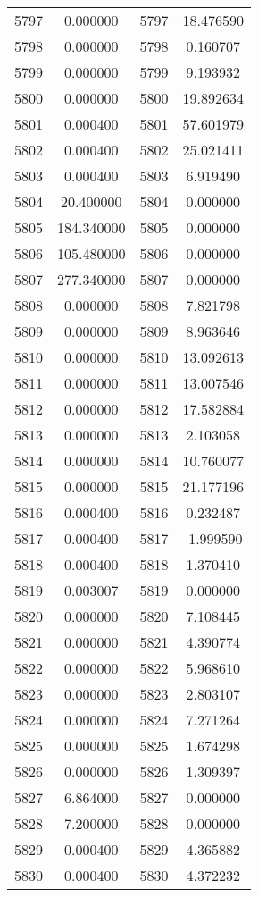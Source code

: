 \documentclass[12pt]{article}
\begin{document}
\begin{longtable}{@{}cccc@{}}
5797 & 0.000000 & 5797 & 18.476590 \\
5798 & 0.000000 & 5798 & 0.160707 \\
5799 & 0.000000 & 5799 & 9.193932 \\
5800 & 0.000000 & 5800 & 19.892634 \\
5801 & 0.000400 & 5801 & 57.601979 \\
5802 & 0.000400 & 5802 & 25.021411 \\
5803 & 0.000400 & 5803 & 6.919490 \\
5804 & 20.400000 & 5804 & 0.000000 \\
5805 & 184.340000 & 5805 & 0.000000 \\
5806 & 105.480000 & 5806 & 0.000000 \\
5807 & 277.340000 & 5807 & 0.000000 \\
5808 & 0.000000 & 5808 & 7.821798 \\
5809 & 0.000000 & 5809 & 8.963646 \\
5810 & 0.000000 & 5810 & 13.092613 \\
5811 & 0.000000 & 5811 & 13.007546 \\
5812 & 0.000000 & 5812 & 17.582884 \\
5813 & 0.000000 & 5813 & 2.103058 \\
5814 & 0.000000 & 5814 & 10.760077 \\
5815 & 0.000000 & 5815 & 21.177196 \\
5816 & 0.000400 & 5816 & 0.232487 \\
5817 & 0.000400 & 5817 & -1.999590 \\
5818 & 0.000400 & 5818 & 1.370410 \\
5819 & 0.003007 & 5819 & 0.000000 \\
5820 & 0.000000 & 5820 & 7.108445 \\
5821 & 0.000000 & 5821 & 4.390774 \\
5822 & 0.000000 & 5822 & 5.968610 \\
5823 & 0.000000 & 5823 & 2.803107 \\
5824 & 0.000000 & 5824 & 7.271264 \\
5825 & 0.000000 & 5825 & 1.674298 \\
5826 & 0.000000 & 5826 & 1.309397 \\
5827 & 6.864000 & 5827 & 0.000000 \\
5828 & 7.200000 & 5828 & 0.000000 \\
5829 & 0.000400 & 5829 & 4.365882 \\
5830 & 0.000400 & 5830 & 4.372232 \\

\end{longtable}
\end{document}
